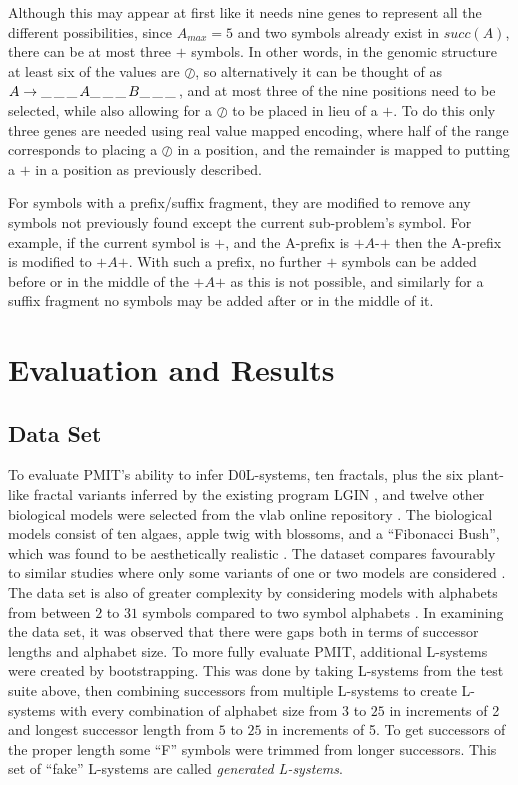 \documentclass{llncs}
\begin{document}
	Although this may appear at first like it needs nine genes to represent all the different possibilities, since $A_{max} = 5$ and two symbols already exist in $succ(A)$, there can be at most three $+$ symbols. In other words, in the genomic structure at least six of the values are $\oslash$, so alternatively it can be thought of as $A \rightarrow \_ \thinspace \_ \thinspace \_ \thinspace A \_ \thinspace \_ \thinspace \_ \thinspace B \_ \thinspace \_ \thinspace \_ \thinspace$, and at most three of the nine positions need to be selected, while also allowing for a $\oslash$ to be placed in lieu of a $+$. To do this only three genes are needed using real value mapped encoding, where half of the range corresponds to placing a $\oslash$ in a position, and the remainder is mapped to putting a $+$ in a position as previously described.
	
	For symbols with a prefix/suffix fragment, they are modified to remove any symbols not previously found except the current sub-problem's symbol. For example, if the current symbol is $+$, and the A-prefix is $\text{+}A\text{-}\text{+}$ then the A-prefix is modified to $\text{+}A\text{+}$. With such a prefix, no further $+$ symbols can be added before or in the middle of the $\text{+}A\text{+}$ as this is not possible, and similarly for a suffix fragment no symbols may be added after or in the middle of it.
	
	\section{Evaluation and Results}
	
	\subsection{Data Set}
	
	To evaluate PMIT's ability to infer D0L-systems, ten fractals, plus the six plant-like fractal variants inferred by the existing program LGIN \cite{beauty,nakano_inferD0Lerrorfree}, and twelve other biological models were selected from the vlab online repository \cite{algorithmicbotany}. The biological models consist of ten algaes, apple twig with blossoms, and a ``Fibonacci Bush'', which was found to be aesthetically realistic \cite{beauty}. The dataset compares favourably to similar studies where only some variants of one or two models are considered \cite{nakano_inferD0Lerrorfree,runqiang_inferGA}. The data set is also of greater complexity by considering models with alphabets from between $2$ to $31$ symbols compared to two symbol alphabets \cite{nakano_inferD0Lerrorfree,runqiang_inferGA}. In examining the data set, it was observed that there were gaps both in terms of successor lengths and alphabet size. To more fully evaluate PMIT, additional L-systems were created by bootstrapping. This was done by taking L-systems from the test suite above, then combining successors from multiple L-systems to create L-systems with every combination of alphabet size from $3$ to $25$ in increments of 2 and longest successor length from $5$ to $25$ in increments of 5. To get successors of the proper length some ``F'' symbols were trimmed from longer successors. This set of ``fake'' L-systems are called \textit{generated L-systems}.
	
\end{document}
